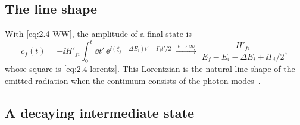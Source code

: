 \subsection*{The line shape}

With \cref{eq:2.4-WW}, the amplitude of a final state is
\begin{equation*}
  c_f(t) = -\ii H'_{fi}\int_0^t\dd t'\,\ee^{\ii(\xi_f - \Delta E_i)t' - \varGamma_it'/2}
  \;\xrightarrow{\;t\to\infty\;}\; \frac{H'_{fi}}{E_f - E_i - \Delta E_i + \ii\varGamma_i/2} ,
\end{equation*}
whose square is \cref{eq:2.4-lorentz}. This Lorentzian is the natural line shape of the emitted radiation when the continuum consists of the photon modes~\cite{weisskopf1930berechnung}.

\subsection*{A decaying intermediate state}

